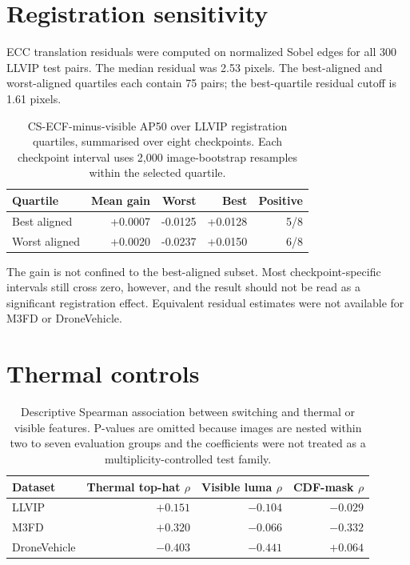 \documentclass[11pt]{article}
\begin{document}
\section{Registration sensitivity}

ECC translation residuals were computed on normalized Sobel edges for all 300
LLVIP test pairs. The median residual was 2.53 pixels. The best-aligned and
worst-aligned quartiles each contain 75 pairs; the best-quartile residual
cutoff is 1.61 pixels.

\begin{table}[h]
\centering
\small
\caption{CS-ECF-minus-visible AP50 over LLVIP registration quartiles, summarised
over eight checkpoints. Each checkpoint interval uses 2,000 image-bootstrap
resamples within the selected quartile.}
\label{tab:alignment}
\begin{tabular}{@{}lrrrr@{}}
\toprule
Quartile & Mean gain & Worst & Best & Positive \\
\midrule
Best aligned & +0.0007 & -0.0125 & +0.0128 & 5/8 \\
Worst aligned & +0.0020 & -0.0237 & +0.0150 & 6/8 \\
\bottomrule
\end{tabular}
\end{table}

The gain is not confined to the best-aligned subset. Most checkpoint-specific
intervals still cross zero, however, and the result should not be read as a
significant registration effect. Equivalent residual estimates were not
available for M3FD or DroneVehicle.

\section{Thermal controls}

\begin{table}[h]
\centering
\small
\caption{Descriptive Spearman association between switching and thermal or
visible features. P-values are omitted because images are nested within two to
seven evaluation groups and the coefficients were not treated as a
multiplicity-controlled test family.}
\begin{tabular}{@{}lrrr@{}}
\toprule
Dataset & Thermal top-hat \(\rho\) & Visible luma \(\rho\) &
CDF-mask \(\rho\) \\
\midrule
LLVIP & \(+0.151\) & \(-0.104\) & \(-0.029\) \\
M3FD & \(+0.320\) & \(-0.066\) & \(-0.332\) \\
DroneVehicle & \(-0.403\) & \(-0.441\) & \(+0.064\) \\
\bottomrule
\end{tabular}
\end{table}
\end{document}
